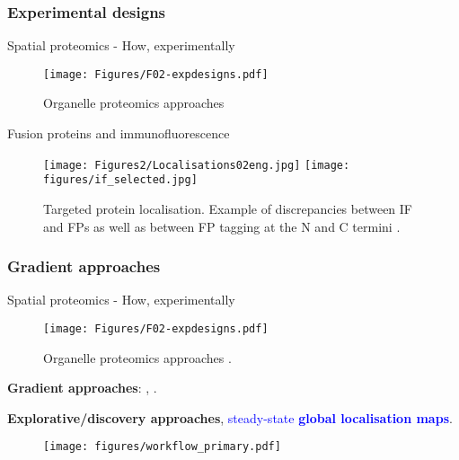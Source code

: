 \subsubsection*{Experimental designs}
\label{sec:expdesign}

\begin{frame}{Spatial proteomics - How, experimentally}
  \begin{figure}
    \texttt{[image: Figures/F02-expdesigns.pdf]}
    \caption{Organelle proteomics approaches \citep{Gatto:2010}}
  \end{figure}
\end{frame}

\begin{frame}{Fusion proteins and immunofluorescence}

  \begin{figure}[h]
    \centering
    \texttt{[image: Figures2/Localisations02eng.jpg]}
    \texttt{[image: figures/if\_selected.jpg]}
    \caption{Targeted protein localisation. Example of discrepancies
      between IF and FPs as well as between FP tagging at the N and C
      termini \citep{Stadler:2013}.}
  \end{figure}
\end{frame}


\subsubsection*{Gradient approaches}
\label{sec:grad}

\begin{frame}{Spatial proteomics - How, experimentally}
  \begin{figure}
    \texttt{[image: Figures/F02-expdesigns.pdf]}
    \caption{Organelle proteomics approaches
      \citep{Gatto:2010}.}
  \end{figure}

  \textbf{Gradient approaches}: \cite{Dunkley:2006},
  \cite{Foster2006}.

  \bigskip

  \textbf{Explorative/discovery approaches},
  \textcolor{Blue}{steady-state \textbf{global localisation maps}}.
\end{frame}


\begin{frame}{}
  \begin{figure}
    \texttt{[image: figures/workflow\_primary.pdf]}
  \end{figure}
\end{frame}

